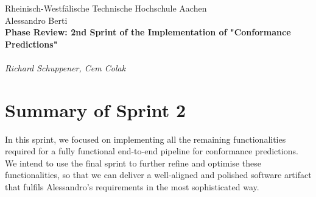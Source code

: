 \documentclass[12pt,a4paper]{article}
\begin{document}
\thispagestyle{empty}
\begin{center}
Rheinisch-Westf\"alische Technische Hochschule Aachen \\
Alessandro Berti\\[6ex]

\LARGE
	\textbf{Phase Review: 2nd Sprint of the Implementation of "Conformance Predictions"} \\[6ex]
        \\
	\textit{Richard Schuppener, Cem Colak} \\[6ex]
\end{center}

\newpage

\tableofcontents
\newpage

\section{Summary of Sprint 2}
In this sprint, we focused on implementing all the remaining functionalities required for a fully functional end-to-end pipeline for conformance predictions. We intend to use the final sprint to further refine and optimise these functionalities, so that we can deliver a well-aligned and polished software artifact that fulfils Alessandro's requirements in the most sophisticated way.
\end{document}
